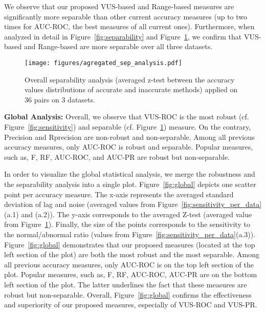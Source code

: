 We observe that our proposed VUS-based and Range-based measures are significantly more separable than other current accuracy measures (up to two times for AUC-ROC, the best measures of all current ones). Furthermore, when analyzed in detail in Figure~\ref{fig:separability} and Figure~\ref{fig:separability_agg}, we confirm that VUS-based and Range-based are more separable over all three datasets. 

\begin{figure}[tb]
  \centering
  \texttt{[image: figures/agregated\_sep\_analysis.pdf]}
  \caption{Overall separability analysis (averaged z-test between the accuracy values distributions of accurate and inaccurate methods) applied on 36 pairs on 3 datasets.}
  \label{fig:separability_agg}
\end{figure}


\noindent \textbf{Global Analysis: } Overall, we observe that VUS-ROC is the most robust (cf. Figure~\ref{fig:sensitivity}) and separable (cf. Figure~\ref{fig:separability_agg}) measure. 
On the contrary, Precision and Rprecision are non-robust and non-separable. 
Among all previous accuracy measures, only AUC-ROC is robust and separable. 
Popular measures, such as, F, RF, AUC-ROC, and AUC-PR are robust but non-separable.

In order to visualize the global statistical analysis, we merge the robustness and the separability analysis into a single plot. Figure~\ref{fig:global} depicts one scatter point per accuracy measure. 
The x-axis represents the averaged standard deviation of lag and noise (averaged values from Figure~\ref{fig:sensitivity_per_data}(a.1) and (a.2)). The y-axis corresponds to the averaged Z-test (averaged value from Figure~\ref{fig:separability_agg}). 
Finally, the size of the points corresponds to the sensitivity to the normal/abnormal ratio (values from Figure~\ref{fig:sensitivity_per_data}(a.3)). 
Figure~\ref{fig:global} demonstrates that our proposed measures (located at the top left section of the plot) are both the most robust and the most separable. 
Among all previous accuracy measures, only AUC-ROC is on the top left section of the plot. 
Popular measures, such as, F, RF, AUC-ROC, AUC-PR are on the bottom left section of the plot. 
The latter underlines the fact that these measures are robust but non-separable.
Overall, Figure~\ref{fig:global} confirms the effectiveness and superiority of our proposed measures, especially of VUS-ROC and VUS-PR.


